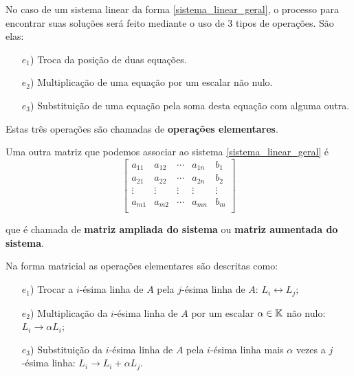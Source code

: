 \documentclass{beamer}
\begin{document}
    \begin{frame}
        No caso de um sistema linear da forma \eqref{sistema_linear_geral}, \pause o processo para encontrar suas soluções ser\'a feito mediante o uso de 3 tipos de opera\c{c}\~oes. \pause S\~ao elas:\pause
        \begin{itemize}
	    \item[$e_1$)] Troca da posi\c{c}\~ao de duas equa\c{c}\~oes.\pause
	    \item[$e_2$)] Multiplica\c{c}\~ao de uma equa\c{c}\~ao por um escalar n\~ao nulo.\pause
	    \item[$e_3$)] Substitui\c{c}\~ao de uma equa\c{c}\~ao pela soma desta equa\c{c}\~ao com alguma outra.\pause
        \end{itemize}

        Estas tr\^es opera\c{c}\~oes s\~ao chamadas de \pause \textbf{opera\c{c}\~oes elementares}.
    \end{frame}

    \begin{frame}
        Uma outra matriz que podemos associar ao sistema \eqref{sistema_linear_geral} \'e\pause
        \[
	    \begin{bmatrix}
                a_{11} & a_{12} & \cdots & a_{1n} & b_1\\
		a_{21} & a_{22} & \cdots & a_{2n} & b_2\\
		\vdots & \vdots & \vdots & \vdots & \vdots\\
		a_{m1} & a_{m2} & \cdots & a_{mn} & b_m\\
            \end{bmatrix}
        \]

        que \'e chamada de \textbf{matriz ampliada do sistema} \pause ou \textbf{matriz aumentada do sistema}.
    \end{frame}

    \begin{frame}
        Na forma matricial \pause as opera\c{c}\~oes elementares s\~ao descritas como:\pause

        \vspace{.3cm}

        \begin{itemize}
            \item[$e_1$)] Trocar a $i$-\'esima linha de $A$ \pause pela $j$-\'esima linha de $A$: \pause $L_i \leftrightarrow L_j$;\pause

            \vspace{.3cm}

            \item[$e_2$)] Multiplica\c{c}\~ao da $i$-\'esima linha de $A$ \pause por um escalar $\alpha \in \mathbb{K}$ n\~ao nulo: \pause $L_i \rightarrow \alpha L_i$;\pause
 
            \vspace{.3cm}

           \item[$e_3$)] Substitui\c{c}\~ao da $i$-\'esima linha de $A$ \pause pela $i$-\'esima linha mais $\alpha$ vezes a $j$-\'esima linha: \pause $L_i \rightarrow L_i + \alpha L_j$.
        \end{itemize}
    \end{frame}
\end{document}
